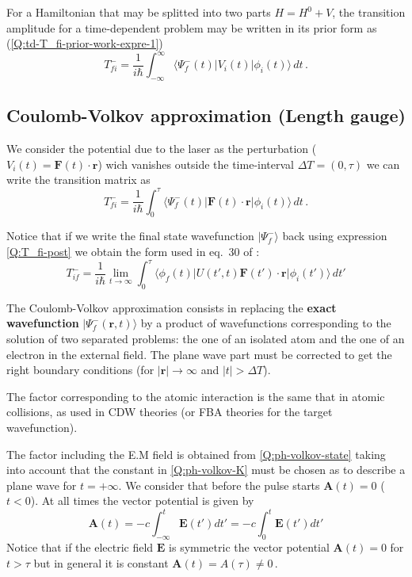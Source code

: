 For a Hamiltonian that may be splitted into two parts $H=H^{0}+V$, the transition amplitude for a time-dependent problem may be written in its prior form as (\ref{Q:td-T_fi-prior-work-expre-1})
\begin{equation*}
  T_{fi}^{-}= \frac{1}{i \hbar} \int_{-\infty}^{\infty} \big\langle \Psi^{-}_{f}(t) \big| V_{i}(t) \big| \phi_{i}(t) \big\rangle   \, dt \,.
\end{equation*}

\subsection{Coulomb-Volkov approximation (Length gauge)}
\label{S:coul-volk-appr}

We consider the potential due to the laser as the perturbation ($V_{i}(t)= \bm{F}(t)\cdot \bm{r}$) wich vanishes outside the time-interval $\Delta T= (0, \tau)$ we can write the transition matrix as
\begin{equation*}
  T_{fi}^{-}= \frac{1}{i \hbar} \int_{0}^{\tau} \big\langle \Psi^{-}_{f}(t) \big| \bm{F}(t)\cdot \bm{r} \big| \phi_{i}(t) \big\rangle   \, dt \,.
\end{equation*}

Notice that if we write the final state wavefunction $|\Psi_{f}^{-}\rangle$ back using expression \eqref{Q:T_fi-post} we obtain 
the form used in eq.~30 of \citet{Milosev2006JPBpR203}:
\begin{equation}\label{Q:tif-milos-form}
T_{if}^{-}  = \frac{1}{i \hbar} \lim_{t \to \infty} \int_{0}^{\tau} \big\langle \phi_{f}(t) \big| U(t',t)  \bm{F}(t')\cdot \bm{r} \big| \phi_{i}(t') \big\rangle \, dt'
\end{equation}

The Coulomb-Volkov approximation consists in replacing the \textbf{exact wavefunction} $|\Psi^{-}_{f}(\bm{r},t)\rangle$ by a product of wavefunctions corresponding to the solution of two separated problems: the one of an isolated atom and the one of an electron in the external field. The plane wave part must be corrected to get the right boundary conditions (for $|\bm{r}|\to \infty$ and $|t| > \Delta T$).

The factor corresponding to the atomic interaction is the same that in atomic collisions, as used in CDW theories (or FBA theories for the target wavefunction).

The factor including the E.M field is obtained from \eqref{Q:ph-volkov-state} taking into account that the constant in \eqref{Q:ph-volkov-K} must be chosen as to describe a plane wave for $t=+\infty$. We consider that before the pulse starts $\bm{A}(t)=0$ ($t<0$). At all times the vector potential is given by
\begin{equation*}
  \bm{A}(t)= - c \int_{-\infty}^{t} \bm{E}(t') dt' = - c \int_{0}^{t} \bm{E}(t') dt' 
\end{equation*}
Notice that if the electric field $\bm{E}$ is symmetric the vector potential $\bm{A}(t)=0$ for $t>\tau$ but in general it is constant $\bm{A}(t)=A(\tau)\ne 0\,$.

